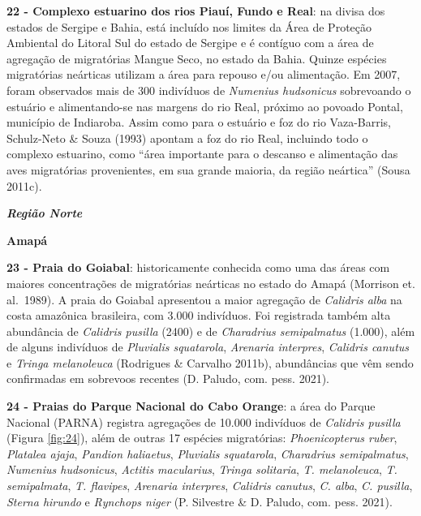 \documentclass[
  oneside]{scrbook}
\begin{document}
\textbf{22 - Complexo estuarino dos rios Piauí, Fundo e Real}: na divisa dos estados de Sergipe e Bahia, está incluído nos limites da Área de Proteção Ambiental do Litoral Sul do estado de Sergipe e é contíguo com a área de agregação de migratórias Mangue Seco, no estado da Bahia. Quinze espécies migratórias neárticas utilizam a área para repouso e/ou alimentação. Em 2007, foram observados mais de 300 indivíduos de \emph{Numenius hudsonicus} sobrevoando o estuário e alimentando-se nas margens do rio Real, próximo ao povoado Pontal, município de Indiaroba. Assim como para o estuário e foz do rio Vaza-Barris, Schulz-Neto \& Souza (1993) apontam a foz do rio Real, incluindo todo o complexo estuarino, como ``área importante para o descanso e alimentação das aves migratórias provenientes, em sua grande maioria, da região neártica'' (Sousa 2011c).

\textbf{\emph{Região Norte}}

\textbf{Amapá}

\textbf{23 - Praia do Goiabal}: historicamente conhecida como uma das áreas com maiores concentrações de migratórias neárticas no estado do Amapá (Morrison et. al.~1989). A praia do Goiabal apresentou a maior agregação de \emph{Calidris alba} na costa amazônica brasileira, com 3.000 indivíduos. Foi registrada também alta abundância de \emph{Calidris pusilla} (2400) e de \emph{Charadrius semipalmatus} (1.000), além de alguns indivíduos de \emph{Pluvialis squatarola}, \emph{Arenaria interpres}, \emph{Calidris canutus} e \emph{Tringa melanoleuca} (Rodrigues \& Carvalho 2011b), abundâncias que vêm sendo confirmadas em sobrevoos recentes (D. Paludo, com. pess. 2021).

\textbf{24 - Praias do Parque Nacional do Cabo Orange}: a área do Parque Nacional (PARNA) registra agregações de 10.000 indivíduos de \emph{Calidris pusilla} (Figura \ref{fig:24}), além de outras 17 espécies migratórias: \emph{Phoenicopterus ruber}, \emph{Platalea ajaja}, \emph{Pandion haliaetus}, \emph{Pluvialis squatarola}, \emph{Charadrius semipalmatus}, \emph{Numenius hudsonicus}, \emph{Actitis macularius}, \emph{Tringa solitaria}, \emph{T. melanoleuca}, \emph{T. semipalmata}, \emph{T. flavipes}, \emph{Arenaria interpres}, \emph{Calidris canutus}, \emph{C. alba}, \emph{C. pusilla}, \emph{Sterna hirundo} e \emph{Rynchops niger} (P. Silvestre \& D. Paludo, com. pess. 2021).
\end{document}
